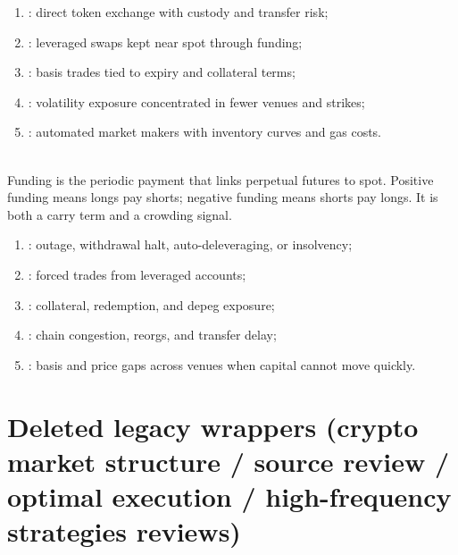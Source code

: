 \documentclass[a4paper,oneside,openany]{book}
\begin{document}
\begin{taxonomy} 
\begin{enumerate}[label=\roman*.]
\setlength{\itemsep}{0pt}
\item {}: direct token exchange with custody and transfer risk;
\item {}: leveraged swaps kept near spot through funding;
\item {}: basis trades tied to expiry and collateral terms;
\item {}: volatility exposure concentrated in fewer venues and strikes;
\item {}: automated market makers with inventory curves and gas costs.
\end{enumerate}
\end{taxonomy}

\begin{definition} \\
Funding is the periodic payment that links perpetual futures to spot. Positive funding means longs pay shorts; negative funding means shorts pay longs. It is both a carry term and a crowding signal.
\end{definition}

\begin{taxonomy} 
\begin{enumerate}[label=\roman*.]
\setlength{\itemsep}{0pt}
\item {}: outage, withdrawal halt, auto-deleveraging, or insolvency;
\item {}: forced trades from leveraged accounts;
\item {}: collateral, redemption, and depeg exposure;
\item {}: chain congestion, reorgs, and transfer delay;
\item {}: basis and price gaps across venues when capital cannot move quickly.
\end{enumerate}
\end{taxonomy}

\section*{Deleted legacy wrappers (crypto market structure / source review / optimal execution / high-frequency strategies reviews)}
\end{document}

